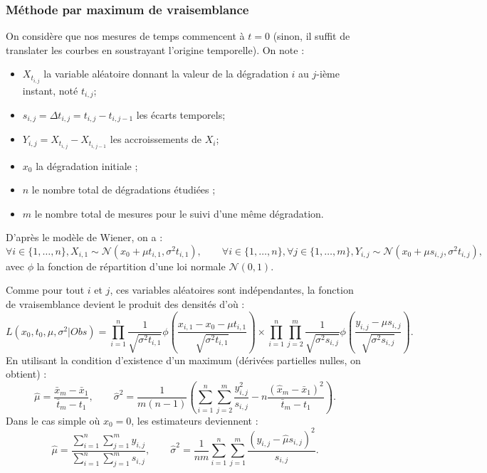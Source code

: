 \documentclass[11pt,a4paper]{article}
\begin{document}
\subsubsection{Méthode par maximum de vraisemblance} \label{estimateurs:wiener:vraisemblance}
On considère que nos mesures de temps commencent à $t = 0$ (sinon, il suffit de translater les courbes en soustrayant l'origine temporelle). On note :
\begin{itemize}
	\item $X_{t_{i,j}}$ la variable aléatoire donnant la valeur de la dégradation $i$ au $j$-ième instant, noté $t_{i,j}$;
	\item $s_{i,j} = \Delta t_{i,j} = t_{i,j}-t_{i,j-1}$ les écarts temporels;
	\item $Y_{i,j} = X_{t_{i,j}}-X_{t_{i,j-1}}$ les accroissements de $X_i$;
	\item $x_0$ la dégradation initiale ;
	\item $n$ le nombre total de dégradations étudiées ;
	\item $m$ le nombre total de mesures pour le suivi d'une même dégradation.
\end{itemize}
D'après le modèle de Wiener, on a : $$
\forall i \in \{1, \dots, n \}, X_{i,1} \sim \mathcal{N}(x_0 + \mu t_{i,1}, \sigma^2 t_{i,1}), \qquad
\forall i \in \{1, \dots, n \}, \forall j \in \{1, \dots, m\}, Y_{i,j} \sim \mathcal{N}(x_0 + \mu s_{i,j}, \sigma^2 t_{i,j}),
$$
avec $\phi$ la fonction de répartition d'une loi normale $\mathcal{N}(0,1)$.

Comme pour tout $i$ et $j$, ces variables aléatoires sont indépendantes, la fonction de vraisemblance devient le produit des densités d'où : $$
L(x_0, t_0, \mu, \sigma^2 | Obs) = \prod_{i=1}^{n} \frac{1}{\sqrt{\sigma^2 t_{i,1}}}\phi (\frac{x_{i,1}-x_0-\mu t_{i,1}}{\sqrt{\sigma ^2 t_{i,1}}}) \times \prod_{i = 1}^{n} \prod_{j = 2}^{m} \frac{1}{\sqrt{\sigma^2 s_{i,j}}}\phi (\frac{y_{i,j}-\mu s_{i,j}}{\sqrt{\sigma ^2 s_{i,j}}}).
$$
En utilisant la condition d'existence d'un maximum (dérivées partielles nulles, on obtient) :
$$
\hat{\mu} = \frac{\bar{x}_m-\bar{x}_1}{\bar{t}_m-t_1}, \qquad
\hat{\sigma}^ 2 = \frac{1}{m(n-1)}(\sum_{i=1}^{n} \sum_{j=2}^{m} \frac{y_{i,j}^2}{s_{i,j}}-n \frac{(\hat{x}_m-\bar{x}_1)^2}{\bar{t}_m-t_1}).
$$
Dans le cas simple où $x_0 = 0$, les estimateurs deviennent :
$$
\hat{\mu}= \frac{\sum_{i=1}^{n} \sum_{j=1}^{m} y_{i,j}}{\sum_{i=1}^{n} \sum_{j=1}^{m} s_{i,j}}, \qquad
\hat{\sigma}^2= \frac{1}{nm} \sum_{i=1}^{n} \sum_{j=1}^{m} \frac{(y_{i,j}-\hat{\mu}s_{i,j})^2}{s_{i,j}}.
$$
\end{document}
